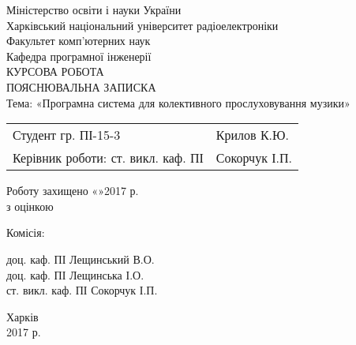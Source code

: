 \begin{center}
    Міністерство освіти і науки України \\
    Харківський національний університет радіоелектроніки \\
    \vspace*{\baselineskip}
    Факультет комп’ютерних наук \\
    \vspace*{\baselineskip}
    Кафедра програмної інженерії \\
    \vspace*{3\baselineskip}
    КУРСОВА РОБОТА \\
    ПОЯСНЮВАЛЬНА ЗАПИСКА \\
    Тема: «Програмна система для колективного прослуховування музики» \\
    \vspace*{3\baselineskip}
\end{center}

\begin{tabular}{ll}
    Студент гр. ПІ-15-3 & \uline{\hspace{7em}}Крилов К.Ю. \\
    Керівник роботи: ст. викл. каф. ПІ & \uline{\hspace{7em}}Сокорчук І.П.
\end{tabular}

\vspace*{\baselineskip}
\begin{adjustwidth}{14em}{}
    Роботу захищено «\uline{\hspace{2em}}»\uline{\hfill}2017 р. \\
    з оцінкою \uline{\hfill} \\
\end{adjustwidth}

Комісія:
\begin{adjustwidth}{14em}{}
    \begin{flushright}
        доц. каф. ПІ \uline{\hfill} Лещинський В.О. \\
        доц. каф. ПІ \uline{\hfill} Лещинська І.О. \\
        ст. викл. каф. ПІ \uline{\hfill} Сокорчук І.П.
    \end{flushright}
\end{adjustwidth}

\vspace*{2\baselineskip}

\begin{center}
    Харків \\
    2017 р. 
\end{center}

\newpage
